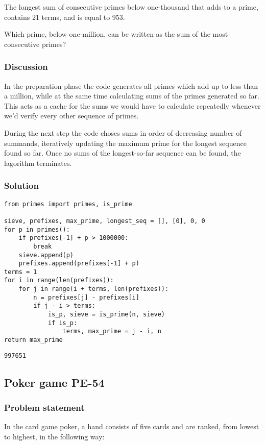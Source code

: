 \documentclass[11pt]{article}
\begin{document}
The longest sum of consecutive primes below one-thousand that adds
to a prime, contains 21 terms, and is equal to 953.

Which prime, below one-million, can be written as the sum of the
most consecutive primes?

\subsubsection{Discussion}
\label{sec:orgheadline11}
In the preparation phase the code generates all primes which add up to less
than a million, while at the same time calculating sums of the primes
generated so far.  This acts as a cache for the sums we would have to
calculate repeatedly whenever we'd verify every other sequence of primes.

During the next step the code choses sums in order of decreasing number of
summands, iteratively updating the maximum prime for the longest sequence
found so far.  Once no sums of the longest-so-far sequence can be found,
the lagorithm terminates.

\subsubsection{Solution}
\label{sec:orgheadline12}
\begin{verbatim}
from primes import primes, is_prime

sieve, prefixes, max_prime, longest_seq = [], [0], 0, 0
for p in primes():
    if prefixes[-1] + p > 1000000:
        break
    sieve.append(p)
    prefixes.append(prefixes[-1] + p)
terms = 1
for i in range(len(prefixes)):
    for j in range(i + terms, len(prefixes)):
        n = prefixes[j] - prefixes[i]
        if j - i > terms:
            is_p, sieve = is_prime(n, sieve)
            if is_p:
                terms, max_prime = j - i, n
return max_prime
\end{verbatim}

\begin{verbatim}
997651
\end{verbatim}

\subsection{Poker game PE-54}
\label{sec:orgheadline17}
\subsubsection{Problem statement}
\label{sec:orgheadline14}
In the card game poker, a hand consists of five cards 
and are ranked, from lowest to highest, in the following way:
\end{document}
